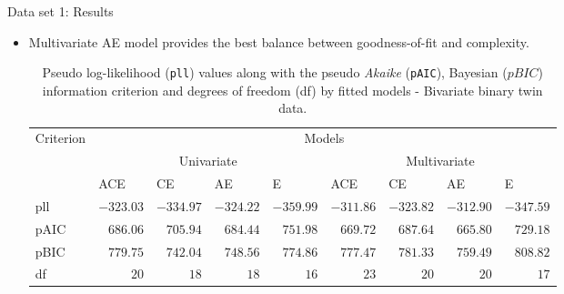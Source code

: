 \documentclass[
  ignorenonframetext,
  serif,
  professionalfont,
  usenames,
  dvipsnames,
  aspectratio = 169]{beamer}
\providecommand{\tightlist}{%
  \setlength{\itemsep}{0pt}\setlength{\parskip}{0pt}}
\renewcommand{\tightlist}{%
  \setlength{\itemsep}{0\baselineskip}
  \setlength{\parskip}{0.25\baselineskip}
}
\begin{document}
\begin{frame}{Data set 1: Results}
\protect\hypertarget{data-set-1-results}{}
\begin{itemize}
\tightlist
\item
  Multivariate AE model provides the best balance between
  goodness-of-fit and complexity. \tiny

  \begin{table}[]
  \caption{Pseudo log-likelihood (\texttt{pll}) values along with the pseudo \textit{Akaike} (\texttt{pAIC}), Bayesian ($pBIC$) information criterion and degrees of freedom (df) by fitted models - Bivariate binary twin data.}
  \label{tab:dataset3}
  \begin{tabular}{lrrrrrrrr}
  \hline
  \multicolumn{1}{|l|}{\multirow{3}{*}{Criterion}} & \multicolumn{8}{c|}{Models}                                                                                                                                                                                   \\ \cline{2-9} 
  \multicolumn{1}{|l|}{}                           & \multicolumn{4}{c|}{Univariate}                                                                       & \multicolumn{4}{c|}{Multivariate}                                                                     \\ \cline{2-9} 
  \multicolumn{1}{|l|}{}                           & \multicolumn{1}{l|}{ACE} & \multicolumn{1}{l|}{CE} & \multicolumn{1}{l|}{AE} & \multicolumn{1}{l|}{E} & \multicolumn{1}{l|}{ACE} & \multicolumn{1}{l|}{CE} & \multicolumn{1}{l|}{AE} & \multicolumn{1}{l|}{E} \\ \hline
  pll  & $-323.03$ & $-334.97$ & $-324.22$ & $-359.99$ & $-311.86$ & $-323.82$ & $-312.90$ & $-347.59$ \\
  pAIC & $686.06$  & $705.94$  & $684.44$  & $751.98$  & $669.72$  & $687.64$  & $665.80$  & $729.18$   \\
  pBIC & $779.75$  & $742.04$  & $748.56$  & $774.86$  & $777.47$  & $781.33$  & $759.49$  & $808.82$ \\
  df   & $20$      & $18$      & $18$      & $16$      & $23$      & $20$      & $20$      &  $17$ \\ \hline            
  \end{tabular}
  \end{table}
\end{itemize}
\end{frame}
\end{document}
